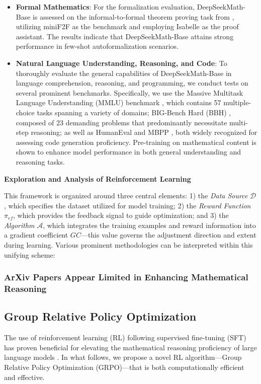 \begin{itemize}[topsep=0pt]
\subsection{Contributions}
This work presents advancements in large-scale math pre-training and investigates the role of reinforcement learning.

Consequently, additional investigation is necessary, which we defer to future research.

\item \textbf{Formal Mathematics}: For the formalization evaluation, DeepSeekMath-Base is assessed on the informal-to-formal theorem proving task from \citep{dsp_proof}, utilizing miniF2F \citep{minif2f} as the benchmark and employing Isabelle \citep{isabelle} as the proof assistant. The results indicate that DeepSeekMath-Base attains strong performance in few-shot autoformalization scenarios.
\item \textbf{Natural Language Understanding, Reasoning, and Code}: To thoroughly evaluate the general capabilities of DeepSeekMath-Base in language comprehension, reasoning, and programming, we conduct tests on several prominent benchmarks. Specifically, we use the Massive Multitask Language Understanding (MMLU) benchmark \citep{mmlu}, which contains 57 multiple-choice tasks spanning a variety of domains; BIG-Bench Hard (BBH) \citep{bbh}, composed of 23 demanding problems that predominantly necessitate multi-step reasoning; as well as HumanEval \citep{codex} and MBPP \citep{mbpp}, both widely recognized for assessing code generation proficiency. Pre-training on mathematical content is shown to enhance model performance in both general understanding and reasoning tasks.
\end{itemize}

\textbf{Exploration and Analysis of Reinforcement Learning}

This framework is organized around three central elements: 1) the \textit{Data Source} $\mathcal{D}$, which specifies the dataset utilized for model training; 2) the \textit{Reward Function} $\pi_{{rf}}$, which provides the feedback signal to guide optimization; and 3) the \textit{Algorithm} $\mathcal{A}$, which integrates the training examples and reward information into a gradient coefficient $GC$—this value governs the adjustment direction and extent during learning. Various prominent methodologies can be interpreted within this unifying scheme:

\subsubsection{ArXiv Papers Appear Limited in Enhancing Mathematical Reasoning}

\subsection{Group Relative Policy Optimization} The use of reinforcement learning (RL) following supervised fine-tuning (SFT) has proven beneficial for elevating the mathematical reasoning proficiency of large language models \citep{wang2023math,wizardmath}. In what follows, we propose a novel RL algorithm—Group Relative Policy Optimization (GRPO)—that is both computationally efficient and effective.